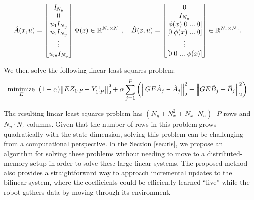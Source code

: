 \documentclass[../root.tex]{subfiles}
\begin{document}
\begin{equation}
  \hat{A}(x,u) =  \begin{bmatrix} 
    I_{N_y} \\ 0 \\ u_1 I_{N_y} \\ u_2 I_{N_y} \\ \vdots \\ u_m I_{N_y} 
  \end{bmatrix} \Phi(x) \in \mathbb{R}^{N_z \times N_x}, \quad
  \hat{B}(x,u) = \begin{bmatrix} 
    0 \\ 
    I_{N_u} \\ 
    [\phi(x) \; 0 \; ... \; 0] \\
    [0 \; \phi(x) \; ... \; 0] \\
    \vdots \\
    [0 \; 0 \; ... \; \phi(x)] \\
  \end{bmatrix} \in \mathbb{R}^{N_z \times N_u}.
\end{equation}

We then solve the following linear least-squares problem:
\begin{align} \label{opt:jdmd}
  \underset{E}{\text{minimize}} \;\; 
    (1-\alpha) \norm{E Z_{1:P} - Y_{1:P}^+}_2^2 + 
        \alpha \sum_{j=1}^P \left( 
          \norm{G E \hat{A}_j - \tilde{A}_j}_2^2 + 
          \norm{G E \hat{B}_j - \tilde{B}_j}_2^2 \right)
\end{align}

The resulting linear least-squares problem has $(N_y + N_x^2 + N_x \cdot N_u) \cdot P$ rows
and $N_y \cdot N_z$ columns. Given that the number of rows in this problem grows
quadratically with the state dimension, solving this problem can be challenging from a
computational perspective. In the Section \ref{sec:rls}, we propose an algorithm for solving
these problems without needing to move to a distributed-memory setup in order to solve these
large linear systems. The proposed method also provides a straightforward way to approach
incremental updates to the bilinear system, where the coefficients could be efficiently
learned ``live'' while the robot gathers data by moving through its environment.

\end{document}
